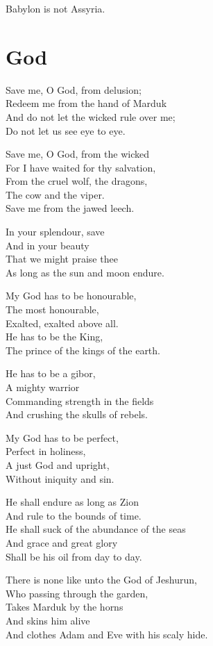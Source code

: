 \documentclass[
]{book}
\begin{document}
Babylon is not Assyria.

\chapter{God}\label{god}

Save me, O God, from delusion;\\
Redeem me from the hand of Marduk\\
And do not let the wicked rule over me;\\
Do not let us see eye to eye.

Save me, O God, from the wicked\\
For I have waited for thy salvation,\\
From the cruel wolf, the dragons,\\
The cow and the viper.\\
Save me from the jawed leech.

In your splendour, save\\
And in your beauty\\
That we might praise thee\\
As long as the sun and moon endure.

My God has to be honourable,\\
The most honourable,\\
Exalted, exalted above all.\\
He has to be the King,\\
The prince of the kings of the earth.

He has to be a gibor,\\
A mighty warrior\\
Commanding strength in the fields\\
And crushing the skulls of rebels.

My God has to be perfect,\\
Perfect in holiness,\\
A just God and upright,\\
Without iniquity and sin.

He shall endure as long as Zion\\
And rule to the bounds of time.\\
He shall suck of the abundance of the seas\\
And grace and great glory\\
Shall be his oil from day to day.

There is none like unto the God of Jeshurun,\\
Who passing through the garden,\\
Takes Marduk by the horns\\
And skins him alive\\
And clothes Adam and Eve with his scaly hide.
\end{document}
